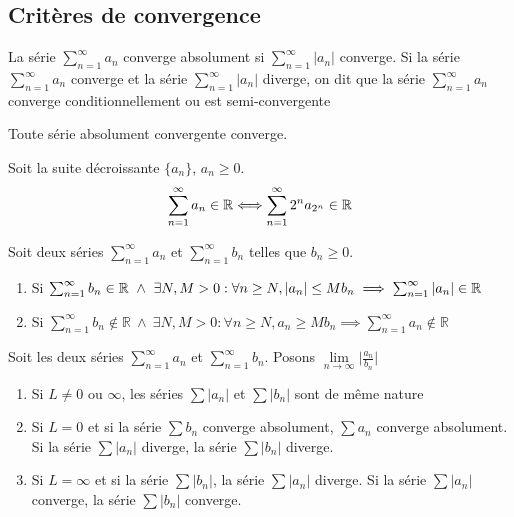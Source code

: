 	\subsection{Critères de convergence}
		\begin{mydef}
			La série $\sum_{n=1}^{\infty}a_n$ converge absolument si $\sum_{n=1}^{\infty}|a_n|$ converge. Si la série $\sum_{n=1}^{\infty}a_n$ converge et la série $\sum_{n=1}^{\infty}|a_n|$ diverge, on dit que la série $\sum_{n=1}^{\infty}a_n$ converge conditionnellement ou est semi-convergente
		\end{mydef}
		\begin{mythm}
			Toute série absolument convergente converge.
		\end{mythm}
		\begin{mythm}
			Soit la suite décroissante $\{a_n\}$, $a_n\geq 0$.\[\sum_{n=1}^{\infty}a_n\in\mathbb{R}\Longleftrightarrow\sum_{n=1}^{\infty}2^n a_{2^n}\in\mathbb{R}\]
		\end{mythm}
		\begin{mythm}
			Soit deux séries $\sum_{n=1}^{\infty}a_n$ et $\sum_{n=1}^{\infty}b_n$ telles que $b_n\geq 0$.
			\begin{enumerate}[label=\alph*)]
				\item Si $\sum_{n=1}^{\infty}b_n\in\mathbb{R}~\wedge~\exists N,M >0 :\forall n\geq N, |a_n|\leq Mb_n\implies \sum_{n=1}^{\infty}|a_n|\in\mathbb{R}$
				\item Si $\sum_{n=1}^{\infty}b_n\notin\mathbb{R}~\wedge~\exists N,M>0 : \forall n\geq N, a_n\geq Mb_n\implies \sum_{n=1}^{\infty}a_n\notin\mathbb{R}$
			\end{enumerate}
		\end{mythm}
		\begin{mythm}
			Soit les deux séries $\sum_{n=1}^{\infty}a_n$ et $\sum_{n=1}^{\infty}b_n$. Posons $\lim\limits_{n\to \infty}\Big|\frac{a_n}{b_n}\Big|$
			\begin{enumerate}[label=\alph*)]
				\item Si $L\neq 0$ ou $\infty$, les séries $\sum|a_n|$ et $\sum|b_n|$ sont de même nature
				\item Si $L=0$ et si la série $\sum b_n$ converge absolument, $\sum a_n$ converge absolument. Si la série $\sum|a_n| $ diverge, la série $\sum|b_n|$ diverge.
				\item Si $L=\infty$ et si la série $\sum|b_n|$, la série $\sum|a_n|$ diverge. Si la série $\sum|a_n| $ converge, la série $\sum|b_n|$ converge.
			\end{enumerate}
		\end{mythm}

